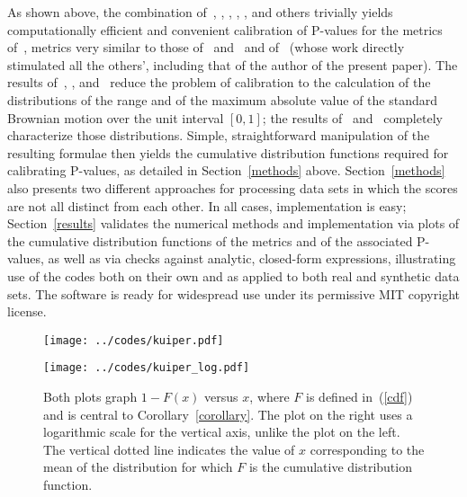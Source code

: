 \documentclass[12pt]{article}
\begin{document}
As shown above, the combination of~\citet{feller}, \citet{darling-siegert},
\citet{delgado}, \citet{diebolt}, \citet{stute}, and others trivially yields
computationally efficient and convenient calibration of P-values
for the metrics of~\citet{tygert_full}, metrics very similar
to those of~\citet{kolmogorov} and~\citet{smirnov} and of~\citet{kuiper}
(whose work directly stimulated all the others', including that
of the author of the present paper).
The results of~\citet{delgado}, \citet{diebolt}, and~\citet{stute}
reduce the problem of calibration to the calculation
of the distributions of the range and of the maximum absolute value
of the standard Brownian motion over the unit interval $[0, 1]$;
the results of~\citet{feller} and~\citet{darling-siegert}
completely characterize those distributions.
Simple, straightforward manipulation of the resulting formulae
then yields the cumulative distribution functions required
for calibrating P-values, as detailed in Section~\ref{methods} above.
Section~\ref{methods} also presents two different approaches for processing
data sets in which the scores are not all distinct from each other.
In all cases, implementation is easy; Section~\ref{results} validates
the numerical methods and implementation via plots
of the cumulative distribution functions of the metrics
and of the associated P-values, as well as via checks
against analytic, closed-form expressions, illustrating use of the codes
both on their own and as applied to both real and synthetic data sets.
The software is ready for widespread use
under its permissive MIT copyright license.



\newlength{\imsize}
\setlength{\imsize}{.48\textwidth}
\newlength{\imsized}
\setlength{\imsized}{.59\textwidth}


\begin{figure}
\begin{center}
\parbox{\imsize}{\texttt{[image: ../codes/kuiper.pdf]}}
\quad
\parbox{\imsize}{\texttt{[image: ../codes/kuiper\_log.pdf]}}
\end{center}
\vspace{-.125in}
\caption{Both plots graph $1 - F(x)$ versus $x$, where
$F$ is defined in~(\ref{cdf}) and is central to Corollary~\ref{corollary}.
The plot on the right uses a logarithmic scale for the vertical axis,
unlike the plot on the left. The vertical dotted line indicates
the value of $x$ corresponding to the mean of the distribution
for which $F$ is the cumulative distribution function.}
\label{kuiper_plot}
\end{figure}
\end{document}
